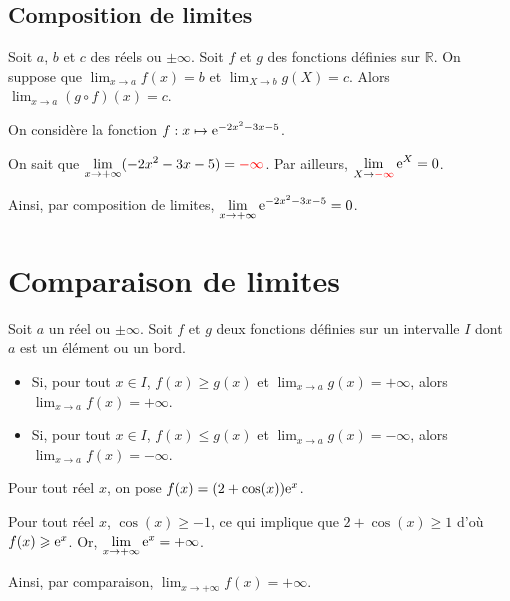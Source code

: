 \documentclass[11pt,fleqn, openany]{book} %
\begin{document}
\subsection{Composition de limites}

\begin{proposition}Soit $a$, $b$ et $c$ des réels ou $\pm \infty$. Soit $f$ et $g$ des fonctions définies sur $\mathbb{R}$.
On suppose que $\displaystyle\lim_{x \to a}f(x)=b$ et $\displaystyle\lim_{X \to b}g(X)=c$. Alors $\displaystyle\lim_{x \to a}(g \circ f)(x)=c$.
\end{proposition}


\begin{example} On considère la fonction $f:x\mapsto \mathrm{e}^{-2x^2-3x-5}$. 

On sait que $\displaystyle \lim_{x \to +\infty} (-2x^2-3x-5) = \color{red}{-\infty}$. Par ailleurs, $\displaystyle\lim_{X \to \color{red}{-\infty}}\color{black}\mathrm{e}^X=0$. 

Ainsi, par composition de limites, $\displaystyle \lim_{x \to +\infty} \mathrm{e}^{-2x^2-3x-5}=0$.\end{example}



\section{Comparaison de limites}

\begin{theorem}Soit $a$ un réel ou $\pm \infty$. Soit $f$ et $g$ deux fonctions définies sur un intervalle $I$ dont $a$ est un élément ou un bord.
\begin{itemize}
\item Si, pour tout $x\in I$, $f(x)\geqslant g(x)$ et $\displaystyle \lim_{x \to a} g(x)=+\infty$, alors $\displaystyle \lim_{x \to a} f(x)=+\infty$.
\item Si, pour tout $x\in I$, $f(x)\leqslant g(x)$ et $\displaystyle \lim_{x \to a} g(x)=-\infty$, alors $\displaystyle \lim_{x \to a} f(x)=-\infty$.
\end{itemize}\end{theorem}

\begin{example}Pour tout réel $x$, on pose $f(x)=(2+\cos(x))\mathrm{e}^x$. 

Pour tout réel $x$, $\cos(x)\geqslant -1$, ce qui implique que $2+\cos(x)\geqslant 1$ d'où $f(x)\geqslant \mathrm{e}^x$. Or, $\displaystyle \lim_{x \to +\infty} \mathrm{e}^x=+\infty$. 

Ainsi, par comparaison, $\displaystyle \lim_{x \to +\infty} f(x)=+\infty$.\end{example}
\end{document}
